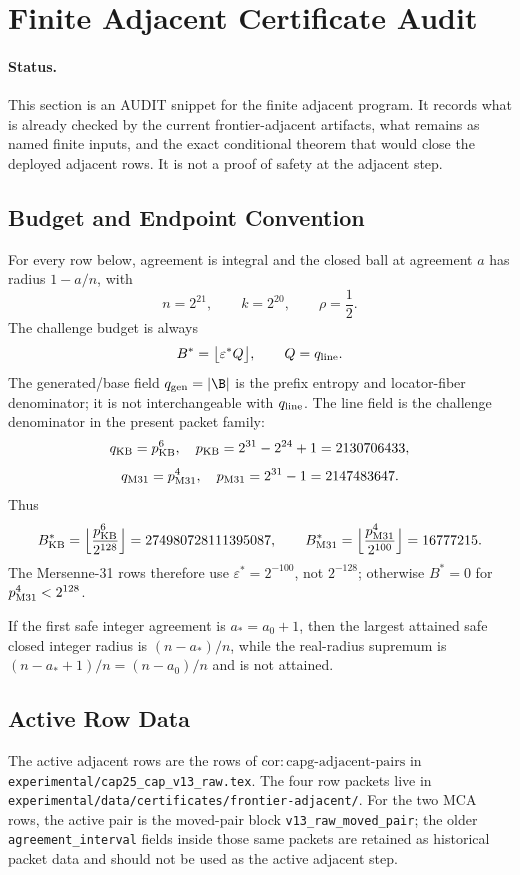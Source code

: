 \section{Finite Adjacent Certificate Audit}
\label{sec:finite-adjacent-certificate-audit}

\paragraph{Status.}
This section is an \textup{AUDIT} snippet for the finite adjacent program.
It records what is already checked by the current frontier-adjacent artifacts,
what remains as named finite inputs, and the exact conditional theorem that
would close the deployed adjacent rows.  It is not a proof of safety at the
adjacent step.

\subsection{Budget and Endpoint Convention}

For every row below, agreement is integral and the closed ball at agreement
\(a\) has radius \(1-a/n\), with
\[
        n=2^{21},\qquad k=2^{20},\qquad \rho=\frac12.
\]
The challenge budget is always
\[
        B^*=\bigl\lfloor \varepsilon^* Q\bigr\rfloor,
        \qquad Q=q_{\rm line}.
\]
The generated/base field \(q_{\rm gen}=|\B|\) is the prefix entropy and
locator-fiber denominator; it is not interchangeable with \(q_{\rm line}\).
The line field is the challenge denominator in the present packet family:
\[
q_{\rm KB}=p_{\rm KB}^{6},\quad p_{\rm KB}=2^{31}-2^{24}+1=2130706433,
\]
\[
q_{\rm M31}=p_{\rm M31}^{4},\quad p_{\rm M31}=2^{31}-1=2147483647.
\]
Thus
\[
B^*_{\rm KB}=\Bigl\lfloor\frac{p_{\rm KB}^6}{2^{128}}\Bigr\rfloor
      =274980728111395087,
\qquad
B^*_{\rm M31}=\Bigl\lfloor\frac{p_{\rm M31}^4}{2^{100}}\Bigr\rfloor
      =16777215.
\]
The Mersenne-31 rows therefore use \(\varepsilon^*=2^{-100}\), not
\(2^{-128}\); otherwise \(B^*=0\) for \(p_{\rm M31}^{4}<2^{128}\).

If the first safe integer agreement is \(a_*=a_0+1\), then the largest
attained safe closed integer radius is \((n-a_*)/n\), while the real-radius
supremum is \((n-a_*+1)/n=(n-a_0)/n\) and is not attained.

\subsection{Active Row Data}

The active adjacent rows are the rows of
\(\mathrm{cor{:}capg\text{-}adjacent\text{-}pairs}\) in
\texttt{experimental/cap25\_cap\_v13\_raw.tex}.  The four row packets live in
\texttt{experimental/data/certificates/frontier-adjacent/}.  For the two MCA
rows, the active pair is the moved-pair block
\texttt{v13\_raw\_moved\_pair}; the older \texttt{agreement\_interval} fields
inside those same packets are retained as historical packet data and should
not be used as the active adjacent step.

